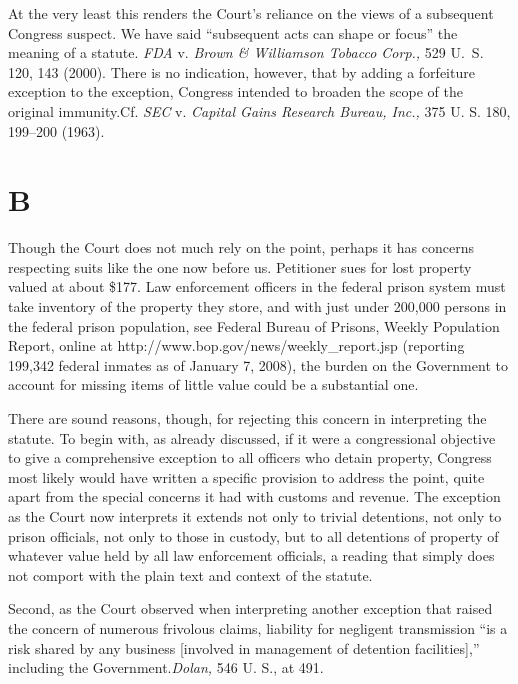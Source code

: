   At the very least this renders the Court's reliance on the views of a subsequent Congress suspect. We have said ``subsequent acts can shape or focus'' the meaning of a statute. \emph{FDA} v. \emph{Brown \& Williamson Tobacco Corp.,} 529 U.~S. 120, 143 (2000). There is no indication, however, that by adding a forfeiture exception to the exception, Congress intended to broaden the scope of the original immunity.Cf. \emph{SEC} v. \emph{Capital Gains Research Bureau, Inc.,} 375 U. S. 180, 199--200 (1963).

\section{B}

  Though the Court does not much rely on the point, perhaps it has concerns respecting suits like the one now before us. Petitioner sues for lost property valued at about \$177. Law enforcement officers in the federal prison system must take inventory of the property they store, and with just under 200,000 persons in the federal prison population, see Federal Bureau of Prisons, Weekly Population Report, online at http://www.bop.gov/news/weekly_report.jsp (reporting 199,342 federal inmates as of January 7, 2008), the burden on the Government to account for missing items of little value could be a substantial one.

  There are sound reasons, though, for rejecting this concern in interpreting the statute. To begin with, as already discussed, if it were a congressional objective to give a comprehensive exception to all officers who detain property, \newpage  Congress most likely would have written a specific provision to address the point, quite apart from the special concerns it had with customs and revenue. The exception as the Court now interprets it extends not only to trivial detentions, not only to prison officials, not only to those in custody, but to all detentions of property of whatever value held by all law enforcement officials, a reading that simply does not comport with the plain text and context of the statute.

  Second, as the Court observed when interpreting another exception that raised the concern of numerous frivolous claims, liability for negligent transmission ``is a risk shared by any business [involved in management of detention facilities],'' including the Government.\emph{Dolan,} 546 U. S., at 491.

